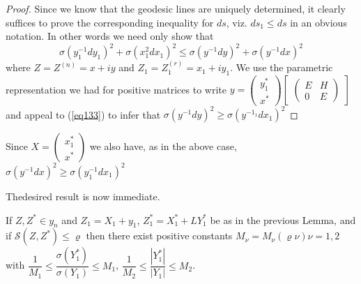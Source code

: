 \begin{proof}%
Since we know that the geodesic lines are uniquely determined, it
clearly suffices to prove the corresponding inequality for $ds$, viz.
$ds_1 \le d s$ in an obvious notation. In other
words we need only show that 
$$
\sigma (y^{-1}_1 dy_1)^2 + \sigma (x_1^2  d x_1)^2 \le \sigma (y^{-1}
dy)^2 + \sigma(y^{-1} dx)^2 
$$
where $Z = Z^{(n)} = x + iy$ and $Z_1= Z^{(r)}_1 = x_1 + iy_1$. We use
the parametric representation we had for positive matrices to write $
y = \begin{pmatrix}y_1^*
  \\ x^* \end{pmatrix}\begin{bmatrix} \begin{pmatrix} E & H \\ 0 
   & E \end{pmatrix} \end{bmatrix}$ and appeal to (\ref{eq133}) to infer that
$\sigma (y^{-1} dy)^2 \ge \sigma(y^{-1_1} dx_1)^2$ 
\end{proof}

Since $X = \begin{pmatrix}x_1^* \\ x^* \end{pmatrix}$ we also have, as
in the above case, $\sigma (y^{-1} dx)^2 \ge \sigma(y^{-1}_1 dx_1 )^2$  

\setcounter{pageoriginal}{100}
The\pageoriginale  desired result is now immediate.

\begin{lem}\label{chap7:lem13}%
If $Z , Z^* \in y_n$ and $Z_1 = X_1 + y_1$, $Z^*_1 = X^*_1 +
LY^*_1$ be as in the previous Lemma, and if $\mathscr{S}(Z ,
Z^*) \le \varrho$ then there exist positive constants $M_\nu =
M_\nu (\varrho \nu ) \nu = 1,2$ with  $\dfrac{1}{M_1} \le
\dfrac{\sigma (Y^*_1)}{\sigma (Y_1)} \le M_1$, $\dfrac{1}{M_2} \le
\dfrac{|Y^*_1|}{|Y_1|} \le M_2$. 
\end{lem}

